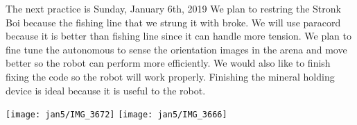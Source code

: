 \documentclass[12pt]{article}
\begin{document}
The next practice is Sunday, January 6th, 2019
We plan to restring the Stronk Boi because the fishing line that we strung it with broke. We will use paracord because it is better than fishing line since it can handle more tension. We plan to fine tune the autonomous to sense the orientation images in the arena and move better so the robot can perform more efficiently. We would also like to finish fixing the code so the robot will work properly. Finishing the mineral holding device is ideal because it is useful to the robot.

\texttt{[image: jan5/IMG\_3672]}
\texttt{[image: jan5/IMG\_3666]}
\end{document}
